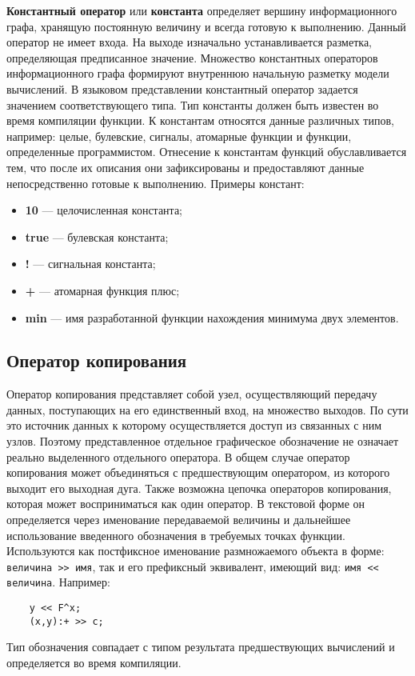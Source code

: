 \textbf{Константный оператор} или \textbf{константа} определяет вершину информационного графа, хранящую постоянную величину и всегда готовую к выполнению. Данный оператор не имеет входа. На выходе изначально устанавливается разметка, определяющая предписанное значение. Множество константных операторов информационного графа формируют внутреннюю начальную разметку модели вычислений. В языковом представлении константный оператор задается значением соответствующего типа. Тип константы должен быть известен во время компиляции функции. К константам относятся данные различных типов, например: целые, булевские, сигналы, атомарные функции и функции, определенные программистом. Отнесение к константам функций обуславливается тем, что после их описания они зафиксированы и предоставляют данные непосредственно готовые к выполнению. Примеры констант:
\begin{itemize}
	\item \textbf{10}	--- целочисленная константа;
	\item \textbf{true}  --- булевская константа;
	\item \textbf{!}     --- сигнальная константа;
	\item \textbf{+}     --- атомарная функция плюс;
	\item \textbf{min}   --- имя разработанной функции нахождения минимума двух элементов.
\end{itemize}

\subsection{Оператор копирования}

Оператор копирования представляет собой узел, осуществляющий передачу данных, поступающих на его единственный вход, на множество выходов. По сути это источник данных к которому осуществляется доступ из связанных с ним узлов. Поэтому представленное отдельное графическое обозначение не означает реально выделенного отдельного оператора. В общем случае оператор копирования может объединяться с предшествующим оператором, из которого выходит его выходная дуга. Также возможна цепочка операторов копирования, которая может восприниматься как один оператор. В текстовой форме он определяется через именование передаваемой величины и дальнейшее использование введенного обозначения в требуемых точках функции. Используются как постфиксное именование размножаемого объекта в форме: \verb|величина >> имя|, так и его префиксный эквивалент, имеющий вид: \verb|имя << величина|. Например:
\begin{verbatim}
	y << F^x;
	(x,y):+ >> c;
\end{verbatim}
Тип обозначения совпадает с типом результата предшествующих вычислений и определяется во время компиляции.

